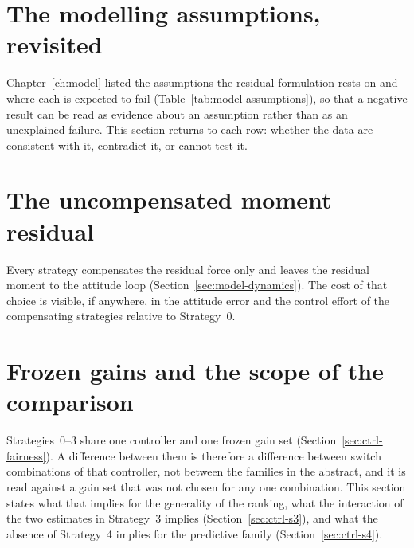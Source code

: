 \section{The modelling assumptions, revisited}
\label{sec:disc-assumptions}

Chapter~\ref{ch:model} listed the assumptions the residual formulation rests on and where each is
expected to fail (Table~\ref{tab:model-assumptions}), so that a negative result can be read as
evidence about an assumption rather than as an unexplained failure. This section returns to each
row: whether the data are consistent with it, contradict it, or cannot test it.


\section{The uncompensated moment residual}
\label{sec:disc-moment}

Every strategy compensates the residual force only and leaves the residual moment to the attitude
loop (Section~\ref{sec:model-dynamics}). The cost of that choice is visible, if anywhere, in the
attitude error and the control effort of the compensating strategies relative to Strategy~0.


\section{Frozen gains and the scope of the comparison}
\label{sec:disc-frozen}

Strategies~0--3 share one controller and one frozen gain set (Section~\ref{sec:ctrl-fairness}). A
difference between them is therefore a difference between switch combinations of that controller,
not between the families in the abstract, and it is read against a gain set that was not chosen for
any one combination. This section states what that implies for the generality of the ranking, what
the interaction of the two estimates in Strategy~3 implies (Section~\ref{sec:ctrl-s3}), and what the
absence of Strategy~4 implies for the predictive family (Section~\ref{sec:ctrl-s4}).

